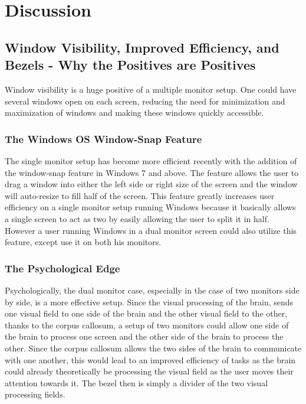 \documentclass[a4paper]{article}
\begin{document}
\section{Discussion}
\subsection{Window Visibility, Improved Efficiency, and Bezels - Why the Positives are Positives}
Window visibility is a huge positive of a multiple monitor setup. One could have several windows open on each screen, reducing the need for minimization and maximization of windows and making these windows quickly accessible. 
\subsubsection{The Windows OS Window-Snap Feature}
The single monitor setup has become more efficient recently with the addition of the window-snap feature in Windows 7 and above. The feature allows the user to drag a window into either the left side or right size of the screen and the window will auto-resize to fill half of the screen. This feature greatly increases user efficiency on a single monitor setup running Windows because it basically allows a single screen to act as two by easily allowing the user to split it in half. However a user running Windows in a dual monitor screen could also utilize this feature, except use it on both his monitors.
\subsubsection{The Psychological Edge}
Psychologically, the dual monitor case, especially in the case of two monitors side by side, is a more effective setup. Since the visual processing of the brain, sends one visual field to one side of the brain and the other visual field to the other, thanks to the corpus callosum, a setup of two monitors could allow one side of the brain to process one screen and the other side of the brain to process the other. Since the corpus callosum allows the two sides of the brain to communicate with one another, this would lead to an improved efficiency of tasks as the brain could already theoretically be processing the visual field as the user moves their attention towards it. The bezel then is simply a divider of the two visual processing fields.
\end{document}
